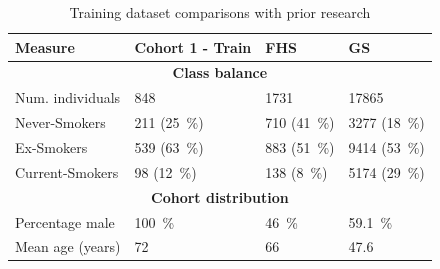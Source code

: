 \documentclass{article} %
\begin{document}
\begin{table}[b]
    \caption{Training dataset comparisons with prior research} \label{table:dataset-compare-external}
    \begin{tabularx}{\textwidth}{X >{\raggedleft\arraybackslash}X >{\raggedleft\arraybackslash}X >{\raggedleft\arraybackslash}X}
        \toprule
        \textbf{Measure} & \textbf{Cohort 1 - Train}     & \textbf{FHS}                  & \textbf{GS}                    \\
        \midrule
        \multicolumn{4}{c}{\textbf{Class balance}}                                                                        \\
        \midrule
        Num. individuals & \num{848}                     & \num{1731}                    & \num{17865}                    \\
        \addlinespace
        Never-Smokers    & \num{211} (\SI{25}{\percent}) & \num{710} (\SI{41}{\percent}) & \num{3277} (\SI{18}{\percent}) \\
        \addlinespace
        Ex-Smokers       & \num{539} (\SI{63}{\percent}) & \num{883} (\SI{51}{\percent}) & \num{9414} (\SI{53}{\percent}) \\
        \addlinespace
        Current-Smokers  & \num{98} (\SI{12}{\percent})  & \num{138} (\SI{8}{\percent})  & \num{5174} (\SI{29}{\percent}) \\
        \midrule
        \multicolumn{4}{c}{\textbf{Cohort distribution}}                                                                  \\
        \midrule
        Percentage male  & \SI{100}{\percent}            & \SI{46}{\percent}             & \SI{59.1}{\percent}            \\
        Mean age (years) & \num{72}                      & \num{66}                      & \num{47.6}                     \\
        \bottomrule
    \end{tabularx}
\end{table}
\end{document}
